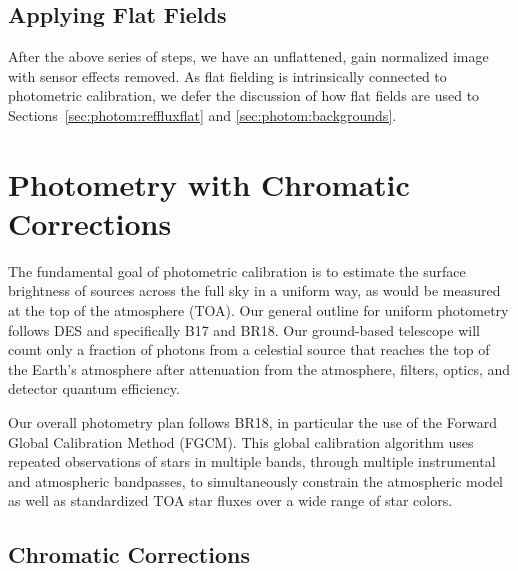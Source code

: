 \documentclass[SE,authoryear,lsstdraft,toc]{lsstdoc}
\begin{document}
\subsection{Applying Flat Fields}

After the above series of steps, we have an unflattened, gain normalized image
with sensor effects removed.  As flat fielding is intrinsically connected to
photometric calibration, we defer the discussion of how flat fields are used to
Sections~\ref{sec:photom:reffluxflat} and \ref{sec:photom:backgrounds}.

\section{Photometry with Chromatic Corrections}
\label{sec:photocal}

The fundamental goal of photometric calibration is to estimate the surface
brightness of sources across the full sky in a uniform way, as would be
measured at the top of the atmosphere (TOA).  Our general outline for uniform
photometry follows DES and specifically B17 and BR18.  Our ground-based
telescope will count only a fraction of photons from a celestial source that
reaches the top of the Earth's atmosphere after attenuation from the
atmosphere, filters, optics, and detector quantum efficiency.

Our overall photometry plan follows BR18, in particular the use of the Forward
Global Calibration Method (FGCM).  This global calibration algorithm uses
repeated observations of stars in multiple bands, through multiple instrumental
and atmospheric bandpasses, to simultaneously constrain the atmospheric model
as well as standardized TOA star fluxes over a wide range of star colors.

\subsection{Chromatic Corrections}
\end{document}
